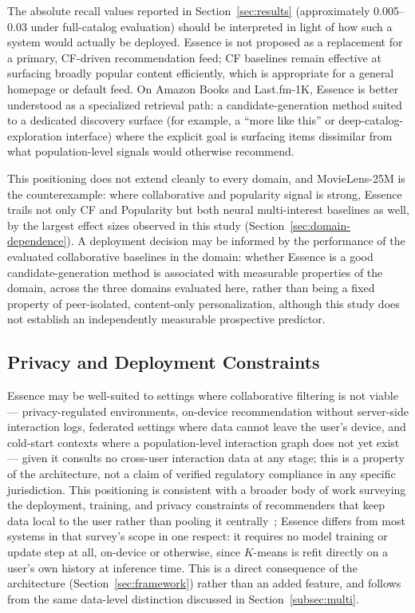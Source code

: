 \documentclass[11pt,a4paper]{article}
\begin{document}
The absolute recall values reported in Section~\ref{sec:results}
(approximately 0.005--0.03 under full-catalog evaluation) should be
interpreted in light of how such a system would actually be deployed.
Essence is not proposed as a replacement for a primary, CF-driven
recommendation feed; CF baselines remain effective at surfacing broadly
popular content efficiently, which is appropriate for a general homepage or
default feed. On Amazon Books and Last.fm-1K, Essence is better understood
as a specialized retrieval path: a candidate-generation method suited to a
dedicated discovery surface (for example, a ``more like this'' or
deep-catalog-exploration interface) where the explicit goal is surfacing
items dissimilar from what population-level signals would otherwise
recommend.

This positioning does not extend cleanly to every domain, and
MovieLens-25M is the counterexample: where collaborative and popularity
signal is strong, Essence trails not only CF and Popularity but both
neural multi-interest baselines as well, by the largest effect sizes
observed in this study (Section~\ref{sec:domain-dependence}). A deployment
decision may be informed by the performance of the evaluated
collaborative baselines in the domain: whether Essence is a good candidate-generation method is
associated with measurable properties of the domain, across the three
domains evaluated here, rather than being a fixed property of
peer-isolated, content-only personalization, although this study does
not establish an independently measurable prospective predictor.

\subsection{Privacy and Deployment Constraints}

Essence may be well-suited to settings where collaborative filtering is not
viable --- privacy-regulated environments, on-device recommendation without
server-side interaction logs, federated settings where data cannot leave the
user's device, and cold-start contexts where a population-level interaction
graph does not yet exist --- given it consults no cross-user interaction data
at any stage; this is a property of the architecture, not a claim of verified
regulatory compliance in any specific jurisdiction. This
positioning is consistent with a broader body of work surveying the
deployment, training, and privacy constraints of recommenders that keep
data local to the user rather than pooling it centrally~\cite{yin2024};
Essence differs from most systems in that survey's scope in one respect:
it requires no model training or update step at all, on-device or
otherwise, since $K$-means is refit directly on a user's own history at
inference time. This
is a direct consequence of the architecture (Section~\ref{sec:framework})
rather than an added feature, and follows from the same data-level
distinction discussed in Section~\ref{subsec:multi}.
\end{document}
